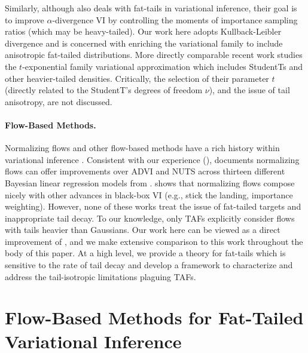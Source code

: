 \documentclass[nohyperref]{article}
\theoremstyle{plain}
\theoremstyle{definition}
\theoremstyle{remark}
\begin{document}
Similarly, although \citet{wang2018variational} also deals with fat-tails in variational inference,
their goal is to improve $\alpha$-divergence VI by controlling the moments of importance
sampling ratios (which may be heavy-tailed). Our work here adopts
Kullback-Leibler divergence and is concerned with enriching the variational family
to include anisotropic fat-tailed distributions.
More directly comparable recent work \citep{ding2011t,futami2017expectation} studies the $t$-exponential family
variational approximation which includes StudentTs and other
heavier-tailed densities. Critically, the selection of their parameter $t$ (directly related to the
StudentT's degrees of freedom $\nu$), and the issue of tail anisotropy, are not discussed. %

\vspace{-1mm}
\paragraph{Flow-Based Methods.}

Normalizing flows and other flow-based methods have a rich history within variational
inference \citep{kingma2016improved,rezende2015variational,agrawal2020advances,webb2019improving}.
Consistent with our experience (), \citet{webb2019improving}
documents normalizing flows can offer improvements over ADVI and NUTS across thirteen different
Bayesian linear regression models from \citet{gelman2006data}.
\citet{agrawal2020advances} shows that normalizing flows compose nicely with other
advances in black-box VI (e.g., stick the landing, importance weighting).
However, none of these works treat the issue of fat-tailed targets and inappropriate tail
decay.
To our knowledge, only TAFs \citep{jaini2020tails} explicitly consider flows with tails
heavier than Gaussians. Our work here can be viewed as a direct improvement of \citet{jaini2020tails},
and we make extensive comparison to this work throughout the body of this paper. At
a high level, we provide a theory for fat-tails which is sensitive to the rate of
tail decay and develop a framework to characterize and address the tail-isotropic limitations plaguing
TAFs.

\vspace{-2mm}
\section{Flow-Based Methods for Fat-Tailed Variational Inference}
\end{document}
